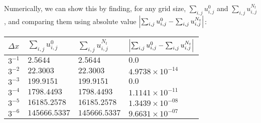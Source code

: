 \documentclass{article} %
\theoremstyle{plain}
\newcommand{\Dx}{\Delta x}
\numberwithin{equation}{section} %
\numberwithin{figure}{section} %
\numberwithin{table}{section} %
\begin{document}
\begin{enumerate}[\ \ (a)]
        Numerically, we can show this by finding, for any grid size, $\sum_{i,j}u_{i,j}^0$ and $\sum_{i,j}u_{i,j}^{N_t}$, and comparing them using absolute value $\abs{\sum_{i,j}u_{i,j}^0 - \sum_{i,j}u_{i,j}^{N_t}}$:
        \begin{table}[ht!]
            \centering
            \begin{tabular}{||l|l|l|l||}\hline\hline
                $\Dx$ & $\sum_{i,j}u_{i,j}^0$ & $\sum_{i,j}u_{i,j}^{N_t}$ & $\abs{\sum_{i,j}u_{i,j}^0 - \sum_{i,j}u_{i,j}^{N_t}}$ \\\hline\hline
                $3^{-1}$ & $2.5644$ & $2.5644$ & $0.0$ \\\hline
                $3^{-2}$ & $22.3003$ & $22.3003$ & $4.9738\times10^{-14}$ \\\hline
                $3^{-3}$ & $199.9151$ & $199.9151$ & $0.0$ \\\hline
                $3^{-4}$ & $1798.4493$ & $1798.4493$ & $1.1141\times10^{-11}$ \\\hline
                $3^{-5}$ & $16185.2578$ & $16185.2578$ & $1.3439\times10^{-08}$ \\\hline
                $3^{-6}$ & $145666.5337$ & $145666.5337$ & $9.6631\times10^{-07}$ \\\hline\hline
            \end{tabular}
        \end{table}
\end{enumerate}
\end{document}
